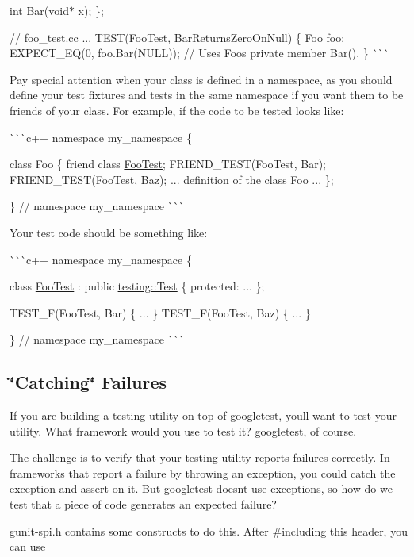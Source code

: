 \begin{DoxyItemize}
int Bar(void$\ast$ x); \};

// foo\+\_\+test.\+cc ... T\+E\+S\+T(\+Foo\+Test, Bar\+Returns\+Zero\+On\+Null) \{ Foo foo; E\+X\+P\+E\+C\+T\+\_\+\+EQ(0, foo.\+Bar(\+N\+U\+L\+L)); // Uses Foo\textquotesingle{}s private member Bar(). \} \`{}\`{}\`{}

Pay special attention when your class is defined in a namespace, as you should define your test fixtures and tests in the same namespace if you want them to be friends of your class. For example, if the code to be tested looks like\+:

\`{}\`{}\`{}c++ namespace my\+\_\+namespace \{

class Foo \{ friend class \mbox{\hyperlink{class_foo_test}{Foo\+Test}}; F\+R\+I\+E\+N\+D\+\_\+\+T\+E\+S\+T(\+Foo\+Test, Bar); F\+R\+I\+E\+N\+D\+\_\+\+T\+E\+S\+T(\+Foo\+Test, Baz); ... definition of the class Foo ... \};

\} // namespace my\+\_\+namespace \`{}\`{}\`{}

Your test code should be something like\+:

\`{}\`{}\`{}c++ namespace my\+\_\+namespace \{

class \mbox{\hyperlink{class_foo_test}{Foo\+Test}} \+: public \mbox{\hyperlink{classtesting_1_1_test}{testing\+::\+Test}} \{ protected\+: ... \};

T\+E\+S\+T\+\_\+\+F(\+Foo\+Test, Bar) \{ ... \} T\+E\+S\+T\+\_\+\+F(\+Foo\+Test, Baz) \{ ... \}

\} // namespace my\+\_\+namespace \`{}\`{}\`{}
\end{DoxyItemize}

\subsection*{\char`\"{}\+Catching\char`\"{} Failures}

If you are building a testing utility on top of googletest, you\textquotesingle{}ll want to test your utility. What framework would you use to test it? googletest, of course.

The challenge is to verify that your testing utility reports failures correctly. In frameworks that report a failure by throwing an exception, you could catch the exception and assert on it. But googletest doesn\textquotesingle{}t use exceptions, so how do we test that a piece of code generates an expected failure?

gunit-\/spi.\+h contains some constructs to do this. After \#including this header, you can use


